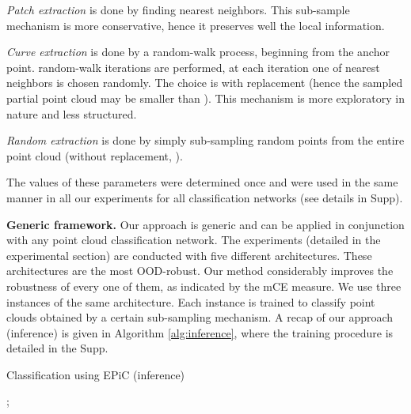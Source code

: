 \documentclass[10pt,twocolumn]{article}
\begin{document}
\textit {Patch extraction} is done by finding  nearest neighbors. This sub-sample mechanism is more conservative, hence it preserves well the local information.

\textit {Curve extraction} is done by a random-walk process, beginning from the anchor point.  random-walk iterations are performed, at each iteration one of  nearest neighbors is chosen randomly. The choice is with replacement (hence the sampled partial point cloud may be smaller than ). This mechanism is more exploratory in nature and less structured.

\textit {Random extraction} is done by simply sub-sampling  random points from the entire point cloud (without replacement, ).

The values of these parameters were determined once  and were used in the same manner in all our experiments for all classification networks (see details in Supp).

{\bf Generic framework.}
Our approach is generic and can be applied in conjunction with any point cloud classification network. 
The experiments (detailed in the experimental section) are conducted with five different architectures. 
These architectures are the most OOD-robust. Our method considerably improves the robustness of every one of them, as indicated by the mCE measure.
We use three instances of the same architecture. Each instance is trained to classify point clouds obtained by a certain sub-sampling mechanism. A recap of our approach (inference) is given in Algorithm \ref{alg:inference}, where the training procedure is detailed in the Supp.


\begin{algorithm}
\caption{Classification using EPiC (inference)}\label{alg:inference}
\begin{algorithmic}
\Require{} 
\State 
\State 
\State 
\State 

\For{} 
\State {}
\State {}
\State {}

\State 
\State 
\State 
\EndFor
\State 
\State ; 

\end{algorithmic}
\end{algorithm}
\end{document}
